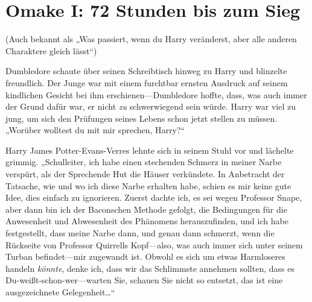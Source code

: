 \section{Omake I: 72 Stunden bis zum Sieg}

(Auch bekannt als „Was passiert, wenn du Harry veränderst, aber alle anderen Charaktere gleich lässt“)

Dumbledore schaute über seinen Schreibtisch hinweg zu Harry und blinzelte freundlich. Der Junge war mit einem furchtbar ernsten Ausdruck auf seinem kindlichen Gesicht bei ihm erschienen—Dumbledore hoffte, dass, was auch immer der Grund dafür war, er nicht \emph{zu} schwerwiegend sein würde. Harry war viel zu jung, um sich den Prüfungen seines Lebens schon jetzt stellen zu müssen. „Worüber wolltest du mit mir sprechen, Harry?“

Harry James Potter-Evans-Verres lehnte sich in seinem Stuhl vor und lächelte grimmig. „Schulleiter, ich habe einen stechenden Schmerz in meiner Narbe verspürt, als der Sprechende Hut die Häuser verkündete. In Anbetracht der Tatsache, wie und wo ich diese Narbe erhalten habe, schien es mir keine gute Idee, dies einfach zu ignorieren. Zuerst dachte ich, es sei wegen Professor Snape, aber dann bin ich der Baconschen Methode gefolgt, die Bedingungen für die Anwesenheit und Abwesenheit des Phänomens herauszufinden, und ich habe festgestellt, dass meine Narbe dann, und genau dann schmerzt, wenn die Rückseite von Professor Quirrells Kopf—also, was auch immer sich unter seinem Turban befindet—mir zugewandt ist. Obwohl es sich um etwas Harmloseres handeln \emph{könnte}, denke ich, dass wir das Schlimmste annehmen sollten, dass es Du-weißt-schon-wer—warten Sie, schauen Sie nicht so entsetzt, das ist eine ausgezeichnete Gelegenheit…“




